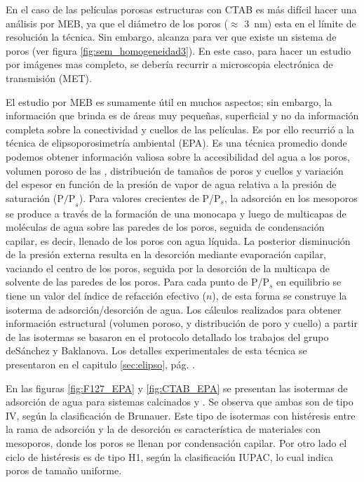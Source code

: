 		 En el caso de las películas porosas estructuras con CTAB es más difícil hacer una análisis por MEB, ya que el diámetro de los poros ($\approx$ \SI{3}{\nm}) esta en el límite de resolución la técnica. Sin embargo, alcanza para  ver que existe un sistema de poros (ver figura \ref{fig:sem_homogeneidad3}). En este caso, para hacer un estudio por imágenes mas completo, se debería recurrir a microscopia electrónica de transmisión (MET).

		 El estudio por MEB es sumamente útil en muchos aspectos; sin embargo, la información que brinda es de áreas muy pequeñas, superficial y no da información completa sobre la conectividad y cuellos de las películas. Es por ello recurrió a la técnica de elipsoporosimetría ambiental (EPA). Es una técnica promedio donde podemos obtener información valiosa sobre la accesibilidad del agua a los poros, volumen poroso de las \pdm, distribución de tamaños de poros y cuellos y variación del espesor en función de la presión de vapor de agua relativa a la presión de saturación ($\text{P/P}_s$). Para valores crecientes de P/P$_s$, la adsorción en los mesoporos se produce a través de la formación de una monocapa y luego de multicapas de moléculas de agua sobre las paredes de los poros, seguida de condensación capilar, es decir, llenado de los poros con agua líquida. La posterior disminución de la presión externa resulta en la desorción mediante evaporación capilar, vaciando el centro de los poros, seguida por la desorción de la multicapa de solvente de las paredes de los poros. Para cada punto de P/P$_s$ en equilibrio se tiene un valor del índice de refacción efectivo ($n$), de esta forma se construye la isoterma de adsorción/desorción de agua. Los cálculos realizados para obtener información estructural (volumen poroso, y distribución de poro y cuello) a partir de las isotermas se basaron en el protocolo detallado los trabajos del grupo deSánchez y Baklanova\cite{Baklanov2000,Boissiere2005,Sakatani2006}. Los detalles experimentales de esta técnica se presentaron en el capitulo \ref{sec:elipso}, pág. \pageref{sec:elipso}.

		 En las figuras \ref{fig:F127_EPA} y \ref{fig:CTAB_EPA} se presentan las isotermas de adsorción de agua para sistemas calcinados \pdmF\space y \pdmC. Se observa que ambas son de tipo IV, según la clasificación de Brunauer\cite{Gregg1967,Violi2015,Fuertes2010}. Este tipo de isotermas con histéresis entre la rama de adsorción y la de desorción es característica de materiales con mesoporos, donde los poros se llenan por condensación capilar. Por otro lado el ciclo de histéresis es de tipo H1, según la clasificación IUPAC, lo cual indica poros de tamaño uniforme.\cite{Gregg1967,Lowell2004,Sing1985a}

